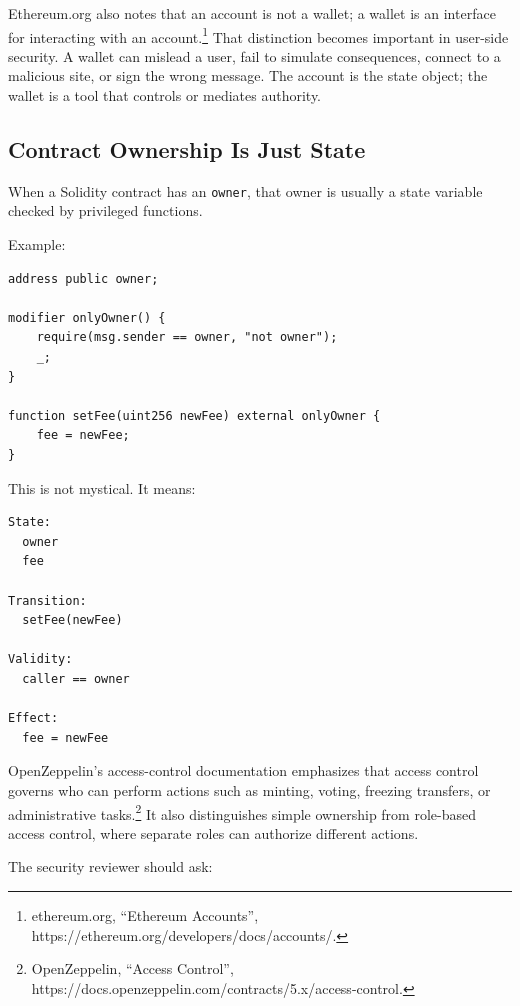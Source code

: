 Ethereum.org also notes that an account is not a wallet; a wallet is an
interface for interacting with an account.\footnote{ethereum.org,
  ``Ethereum Accounts'', https://ethereum.org/developers/docs/accounts/.}
That distinction becomes important in user-side security. A wallet can
mislead a user, fail to simulate consequences, connect to a malicious
site, or sign the wrong message. The account is the state object; the
wallet is a tool that controls or mediates authority.

\subsection{Contract Ownership Is Just State}

When a Solidity contract has an \passthrough{\lstinline!owner!}, that
owner is usually a state variable checked by privileged functions.

Example:

\begin{lstlisting}
address public owner;

modifier onlyOwner() {
    require(msg.sender == owner, "not owner");
    _;
}

function setFee(uint256 newFee) external onlyOwner {
    fee = newFee;
}
\end{lstlisting}

This is not mystical. It means:

\begin{lstlisting}
State:
  owner
  fee

Transition:
  setFee(newFee)

Validity:
  caller == owner

Effect:
  fee = newFee
\end{lstlisting}

OpenZeppelin's access-control documentation emphasizes that access
control governs who can perform actions such as minting, voting,
freezing transfers, or administrative tasks.\footnote{OpenZeppelin,
  ``Access Control'',
  https://docs.openzeppelin.com/contracts/5.x/access-control.} It also
distinguishes simple ownership from role-based access control, where
separate roles can authorize different actions.

The security reviewer should ask:

